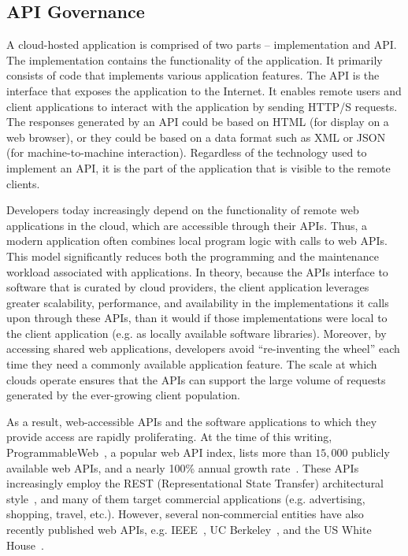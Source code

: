 \subsection{API Governance}
A cloud-hosted application is comprised of two parts -- implementation and API. The implementation
contains the functionality of the application. It primarily consists of code that implements
various application features. The API is the interface that exposes the application to the
Internet. It enables remote users and client applications to interact with the application by sending
HTTP/S requests. The responses generated by an API could be based on HTML (for display on a web
browser), or they could be based on a data format such as XML or JSON (for machine-to-machine 
interaction). Regardless of the technology used to implement an API, it is the part of the application 
that is visible to the remote clients. 

Developers today
increasingly depend on the functionality of remote web applications in the cloud, which
are accessible through their APIs. Thus, a modern application 
often combines local program logic with calls to web APIs. 
This model significantly reduces both the programming and
the maintenance workload associated with applications. In theory, because
the APIs interface to software that is curated by cloud providers, the client
application leverages greater scalability, performance, 
and availability in the implementations it calls upon through these APIs, than
it would if those implementations were local to the client application
(e.g. as locally available software libraries).
Moreover, by accessing shared web applications, developers avoid ``re-inventing the
wheel'' each time they need a commonly available application feature. The scale at
which clouds operate ensures that the APIs can support the large volume
of requests generated by the ever-growing client population.

As a result, web-accessible APIs and the software applications to which
they provide access are rapidly proliferating. At the time of this writing, 
ProgrammableWeb~\cite{pweb}, a popular web API index, lists more than $15,000$
publicly available web APIs, and a nearly 100\% annual growth rate~\cite{pweb_growth}.
These APIs increasingly employ the REST (Representational State Transfer) architectural style~\cite{Fielding:2000:ASD:932295}, and 
many of them target commercial applications (e.g. advertising, shopping, travel, etc.).
However, several non-commercial entities have also recently published web 
APIs, e.g. IEEE~\cite{ieeeapis}, UC Berkeley~\cite{ucbapis}, and the US White
House~\cite{whitehouseapis}. 

